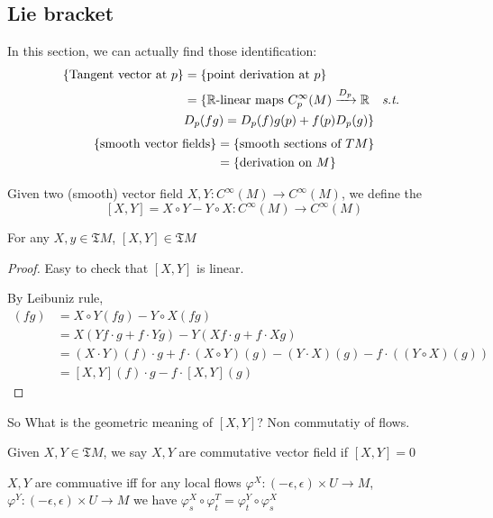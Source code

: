 \subsection{Lie bracket}
In this section, we can actually find those identification:
\begin{align*}
    \{\text{Tangent vector at $ p $}\}&=\{\text{point derivation at $ p $}\}\\
    &=\{\text{$ \mathbb{R} $-linear maps  $ C^\infty_p(M)\xrightarrow{D_p} \mathbb{R} $ \st}\\&D_p(fg)=D_p(f)g(p)+f(p)D_p(g)\}
\end{align*}
\begin{align*}
    \{\text{smooth vector fields}\}&=\{\text{smooth sections of  $ TM $}\}\\
    &=\{\text{derivation on  $ M $}\}
\end{align*}
\begin{definition}
    Given two (smooth) vector field  $ X,Y:C^\infty(M)\rightarrow C^\infty(M) $, we define the 
    \[[X,Y]=X\circ Y-Y\circ X:C^\infty(M)\rightarrow C^\infty(M)\] 
\end{definition}
\begin{theorem}
    For any  $ X,y\in\mathfrak{T}M $,  $ [X,Y]\in \mathfrak{T}M $  
\end{theorem}
\begin{proof}
    Easy to check that  $ [X,Y] $ is linear.
    
    By Leibuniz rule,
    \begin{align*}
        [X,Y](fg)&=X\circ Y(fg)-Y\circ X(fg)\\
        &=X(Yf\cdot g+f\cdot Yg)-Y(Xf\cdot g+f\cdot Xg)\\
        &=(X\cdot Y)(f)\cdot g+f\cdot(X\circ Y)(g)-(Y\cdot X)(g)-f\cdot ((Y\circ X)(g))\\
        &=[X,Y](f)\cdot g- f\cdot [X,Y](g)
    \end{align*}
\end{proof}
So What is the geometric meaning of  $ [X,Y] $? Non commutatiy of flows.
\begin{fact}
    Given  $ X,Y\in \mathfrak{T}M $, we say  $ X,Y $ are commutative vector field if  $ [X,Y]=0 $
    
    $ X,Y $ are commuative iff  for any local flows  $ \varphi^X:(-\epsilon,\epsilon)\times U\rightarrow M $, $ \varphi^Y:(-\epsilon,\epsilon)\times U\rightarrow M $  we have $ \varphi_s^X\circ \varphi_t^T=\varphi_t^Y\circ\varphi_s^X $   
\end{fact} 


